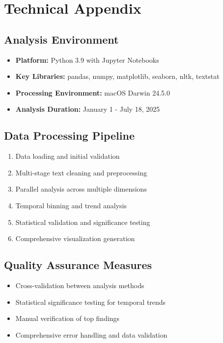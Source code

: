 \documentclass[12pt,a4paper]{article}
\begin{document}
\section{Technical Appendix}

\subsection{Analysis Environment}
\begin{itemize}
\item \textbf{Platform:} Python 3.9 with Jupyter Notebooks
\item \textbf{Key Libraries:} pandas, numpy, matplotlib, seaborn, nltk, textstat
\item \textbf{Processing Environment:} macOS Darwin 24.5.0
\item \textbf{Analysis Duration:} January 1 - July 18, 2025
\end{itemize}

\subsection{Data Processing Pipeline}
\begin{enumerate}
\item Data loading and initial validation
\item Multi-stage text cleaning and preprocessing
\item Parallel analysis across multiple dimensions
\item Temporal binning and trend analysis
\item Statistical validation and significance testing
\item Comprehensive visualization generation
\end{enumerate}

\subsection{Quality Assurance Measures}
\begin{itemize}
\item Cross-validation between analysis methods
\item Statistical significance testing for temporal trends
\item Manual verification of top findings
\item Comprehensive error handling and data validation
\end{itemize}

\vspace{1cm}
\end{document}
